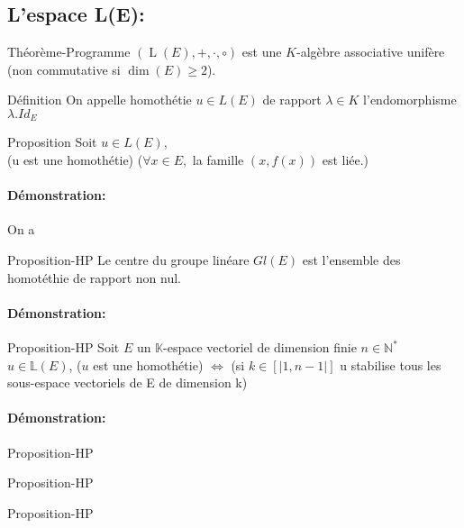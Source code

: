 \documentclass{book}
\begin{document}
\subsection{L'espace L(E):}
\begin{Théorème}[]{Théorème-Programme}{}
    ${\displaystyle (\operatorname {L} (E),+,\cdot ,\circ )}$ est une ${\displaystyle K}$-algèbre associative unifère (non commutative si ${\displaystyle \dim(E)\geq 2}$).
\end{Théorème}
\begin{Définition}[]{Définition}{}
On appelle homothétie \(u \in L(E)\) de rapport \(\lambda \in K\) l'endomorphisme \(\lambda.Id_{E}\)
\end{Définition}
\begin{Propriété}[]{Proposition}{}
    Soit \(u \in L(E)\), 
    \\ (u est une homothétie) \Leftrightarrow (\(\forall x \in E, \) la famille \((x,f(x))\) est liée.)
\end{Propriété}
\paragraph{Démonstration: }
On a 
\begin{Propriété}[]{Proposition-HP}{}
    Le centre du groupe linéare \(Gl(E)\) est l'ensemble des homotéthie de rapport non nul.
\end{Propriété}
\paragraph{Démonstration:}
\begin{Propriété}[]{Proposition-HP}{}
Soit \(E\) un \(\mathbb{K}\)-espace vectoriel de dimension finie \(n \in \mathbb{N}^*\) \(u \in \mathbb{L}(E)\),
    (\(u\) est une homothétie) \(\Leftrightarrow\) (si \(k \in [|1,n-1|]\) u stabilise tous les sous-espace vectoriels de E de dimension k)
\end{Propriété}
\paragraph{Démonstration:}
\begin{Propriété}[]{Proposition-HP}{}

\end{Propriété}
\begin{Propriété}[]{Proposition-HP}{}

\end{Propriété}
\begin{Propriété}[]{Proposition-HP}{}

\end{Propriété}
\end{document}
